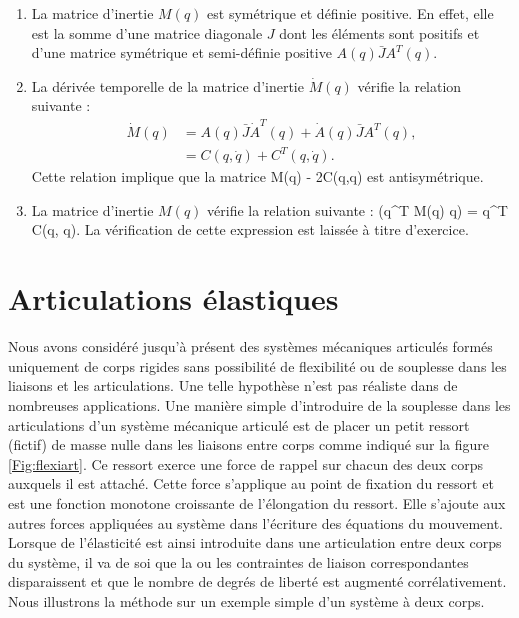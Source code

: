 \begin{enumerate}
\item La matrice d'inertie $M(q)$ est symétrique et définie positive. En effet, elle est
la somme d'une matrice diagonale $J$ dont les éléments sont positifs et d'une
matrice symétrique et semi-définie positive $A(q)\bar{J}A^{T}(q)$.
\item La dérivée temporelle de la matrice d'inertie $\dot M(q)$ vérifie la relation suivante :
\begin{equation*} \begin{split}
\dot M(q) &= A(q)\bar{J}\dot A^{T}(q) + \dot A(q)\bar{J}A^{T}(q),  \\
&= C(q,\dot q) + C^T(q,\dot q). \label{prop2}
\end{split} \end{equation*}
Cette relation implique que la matrice
\eqn
\dot M(q) - 2C(q,\dot q) \label{prop1}
\eeqn
est antisymétrique.
\item La matrice d'inertie $M(q)$ vérifie la relation suivante :
\eqn
{}(\dot q^T M(q) \dot q) = \dot q^T C(q, \dot q). \label{prop2}
\eeqn
La vérification de cette expression est laissée à titre d'exercice.
\end{enumerate}


\section{Articulations élastiques}

Nous avons considéré jusqu'à présent des systèmes mécaniques articulés formés 
uniquement de corps rigides sans possibilité de flexibilité ou de souplesse dans les 
liaisons et les articulations. Une telle hypothèse n'est pas réaliste dans de nombreuses 
applications. Une manière simple d'introduire de la souplesse dans les articulations 
d'un système mécanique articulé est de placer un petit ressort (fictif) de masse nulle 
dans les liaisons entre corps comme indiqué sur la figure \ref{Fig:flexiart}. Ce ressort 
exerce une force de rappel sur chacun des deux corps auxquels il est attaché. Cette force 
s'applique au point de fixation du ressort et est une fonction monotone croissante de 
l'élongation du ressort. Elle s'ajoute aux autres forces appliquées au système dans 
l'écriture des équations du mouvement. Lorsque de l'élasticité est ainsi introduite 
dans une articulation entre deux corps du système, il va de soi que la ou les contraintes 
de liaison correspondantes disparaissent et que le nombre de degrés de liberté est
augmenté corrélativement. Nous illustrons la méthode sur un exemple 
simple d'un système à deux corps. 

